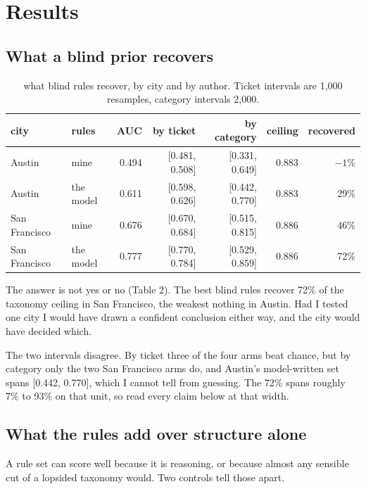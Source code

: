 \documentclass[10pt,a4paper,twocolumn]{article}
\begin{document}
\section*{Results}

\subsection*{What a blind prior recovers}

\begin{table}[t]
\centering
\footnotesize
\begin{tabular}{llrrrrr}
\toprule
city & rules & AUC & by ticket & by category & ceiling & recovered \\
\midrule
Austin & mine & 0.494 & [0.481, 0.508] & [0.331, 0.649] & 0.883 & $-1\%$ \\
Austin & the model & 0.611 & [0.598, 0.626] & [0.442, 0.770] & 0.883 & 29\% \\
San Francisco & mine & 0.676 & [0.670, 0.684] & [0.515, 0.815] & 0.886 & 46\% \\
San Francisco & the model & 0.777 & [0.770, 0.784] & [0.529, 0.859] & 0.886 & 72\% \\
\bottomrule
\end{tabular}
\caption{what blind rules recover, by city and by author. Ticket intervals are 1,000 resamples, category intervals 2,000.}
\end{table}

The answer is not yes or no (Table 2). The best blind rules recover 72\% of the
taxonomy ceiling in San Francisco, the weakest nothing in Austin. Had I tested
one city I would have drawn a confident conclusion either way, and the city would
have decided which.

The two intervals disagree. By ticket three of the four arms beat chance, but by
category only the two San Francisco arms do, and Austin's model-written set spans
[0.442, 0.770], which I cannot tell from guessing. The 72\% spans roughly 7\% to
93\% on that unit, so read every claim below at that width.

\subsection*{What the rules add over structure alone}

A rule set can score well because it is reasoning, or because almost any sensible
cut of a lopsided taxonomy would. Two controls tell those apart.
\end{document}
